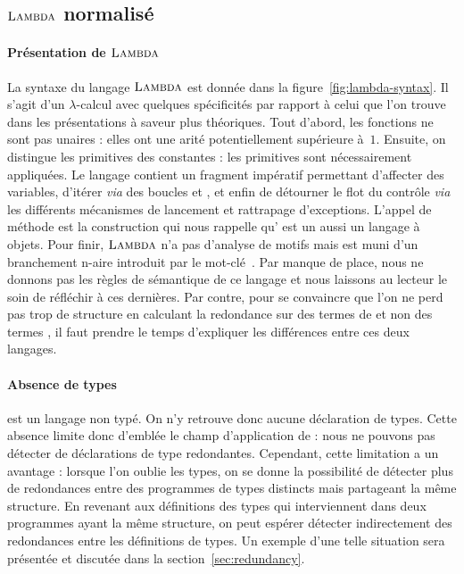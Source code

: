 

\subsection{$\textsc{Lambda}$ normalisé}
\label{sec:lambda}

\paragraph{Présentation de $\textsc{Lambda}$}



La syntaxe du langage $\textsc{Lambda}$ est donnée dans la
figure~\ref{fig:lambda-syntax}. Il s'agit d'un $\lambda$-calcul avec
quelques spécificités par rapport à celui que l'on trouve dans les
présentations à saveur plus théoriques. Tout d'abord, les fonctions ne
sont pas unaires : elles ont une arité potentiellement supérieure
à~$1$. Ensuite, on distingue les primitives des constantes : les
primitives sont nécessairement appliquées. Le langage contient un
fragment impératif permettant d'affecter des variables, d'itérer
\textit{via} des boucles  et , et enfin de
détourner le flot du contrôle \textit{via} les différents mécanismes
de lancement et rattrapage d'exceptions. L'appel de méthode est la
construction qui nous rappelle qu'{\OCaml} est un aussi un langage à
objets. Pour finir, $\textsc{Lambda}$ n'a pas d'analyse de motifs mais est
muni d'un branchement n-aire introduit par le mot-clé~.
%
Par manque de place, nous ne donnons pas les règles de sémantique de
ce langage et nous laissons au lecteur le soin de réfléchir à ces
dernières. Par contre, pour se convaincre que l'on ne perd pas trop de
structure en calculant la redondance sur des termes de {\LambdaCode}
et non des termes {\OCaml}, il faut prendre le temps d'expliquer les
différences entre ces deux langages.

\paragraph{Absence de types}
{\LambdaCode} est un langage non typé. On n'y retrouve donc aucune
déclaration de types. Cette absence limite donc d'emblée le champ
d'application de {\Asak}: nous ne pouvons pas détecter de déclarations
de type redondantes. Cependant, cette limitation a un avantage :
lorsque l'on oublie les types, on se donne la possibilité de détecter
plus de redondances entre des programmes de types distincts mais
partageant la même structure. En revenant aux définitions des types
qui interviennent dans deux programmes ayant la même structure, on
peut espérer détecter indirectement des redondances entre les
définitions de types.
%
Un exemple d'une telle situation sera présentée
et discutée dans la section~\ref{sec:redundancy}.

